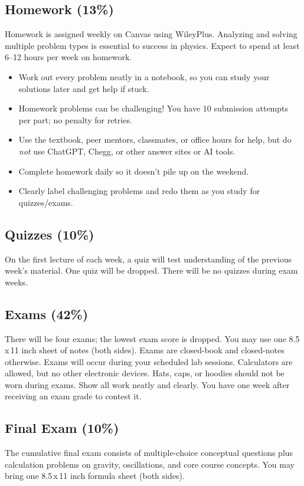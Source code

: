\documentclass[12pt]{article}
\begin{document}
\subsection*{Homework (13\%)}
Homework is assigned weekly on Canvas using WileyPlus. Analyzing and solving multiple problem types is essential to success in physics. Expect to spend at least 6--12 hours per week on homework. 
\begin{itemize}[leftmargin=2em]
  \item Work out every problem neatly in a notebook, so you can study your solutions later and get help if stuck.
  \item Homework problems can be challenging! You have 10 submission attempts per part; no penalty for retries.
  \item Use the textbook, peer mentors, classmates, or office hours for help, but do \emph{not} use ChatGPT, Chegg, or other answer sites or AI tools.
  \item Complete homework daily so it doesn't pile up on the weekend.
  \item Clearly label challenging problems and redo them as you study for quizzes/exams.
\end{itemize}

\subsection*{Quizzes (10\%)}
On the first lecture of each week, a quiz will test understanding of the previous week’s material. One quiz will be dropped. 
There will be no quizzes during exam weeks.

\subsection*{Exams (42\%)}
There will be four exams; the lowest exam score is dropped. 
You may use one 8.5\,x\,11 inch sheet of notes (both sides). 
Exams are closed-book and closed-notes otherwise. 
Exams will occur during your scheduled lab sessions. 
Calculators are allowed, but no other electronic devices. 
Hats, caps, or hoodies should not be worn during exams. 
Show all work neatly and clearly. 
You have one week after receiving an exam grade to contest it.

\subsection*{Final Exam (10\%)}
The cumulative final exam consists of multiple-choice conceptual questions plus calculation problems on gravity, oscillations, and core course concepts. 
You may bring one 8.5\,x\,11 inch formula sheet (both sides).
\end{document}
